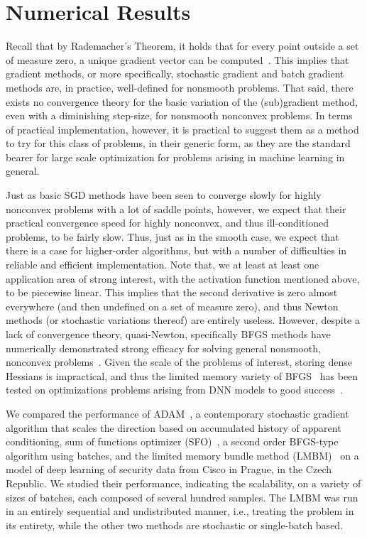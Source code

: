 \documentclass[psamsfonts,onesided,10pt]{amsart}
\theoremstyle{definition}
\theoremstyle{remark}
\numberwithin{equation}{section}
\begin{document}
\section{Numerical Results}\label{s:num}
Recall that by Rademacher's Theorem, it holds that for every point outside a set of measure zero, a unique
gradient vector can be computed~\cite{bessis1999partial}. This implies that gradient methods, or more specifically,
stochastic gradient and batch gradient methods are, in practice, well-defined for nonsmooth problems. That said, there
exists no convergence theory for the basic variation of the (sub)gradient method, even with a diminishing step-size,
for nonsmooth nonconvex problems. In terms of practical implementation, however, it is practical to suggest them
as a method to try for this class of problems, in their generic form, as they are the standard bearer for large
scale optimization for problems arising in machine learning in general. 

Just as basic SGD methods have been seen to converge slowly for highly nonconvex problems with a lot
of saddle points, however, we expect that their practical convergence speed for highly nonconvex, and thus
ill-conditioned problems, to be fairly slow. Thus, just as in the smooth case, we expect that there is a case
for higher-order algorithms, but with a number of difficulties in reliable and efficient implementation. 
Note that, we at least at least one application area of strong interest, with the activation function mentioned above,
to be piecewise linear. This implies that the second derivative is zero almost everywhere (and then undefined on
a set of measure zero), and thus Newton methods (or stochastic variations thereof) are entirely useless. 
However, despite a lack of convergence theory, quasi-Newton, specifically BFGS methods have numerically demonstrated
strong efficacy for solving general nonsmooth, nonconvex problems~\cite{lewis2013nonsmooth}. Given the scale
of the problems of interest, storing dense Hessians is impractical, and thus the limited memory variety of BFGS~\cite{liu1989limited}
has been tested on optimizations problems arising from DNN models to good success~\cite{dean2012large, ngiam2011optimization}.


We compared the performance of ADAM~\cite{kingma2014adam}, a contemporary stochastic gradient algorithm that scales
the direction based on accumulated history of apparent conditioning, sum of functions optimizer (SFO)~\cite{sohl2014fast}, a second order
BFGS-type algorithm using batches, and the limited memory bundle method (LMBM)~\cite{haarala2004new} on a model of 
deep learning of security data from Cisco in Prague, in the Czech Republic. We studied their performance, 
indicating the scalability, on a variety of sizes of batches, each composed of several hundred samples. 
The LMBM was run in an entirely sequential and undistributed manner, i.e., treating the problem in its
entirety, while the other two methods are stochastic or single-batch based. 
\end{document}
